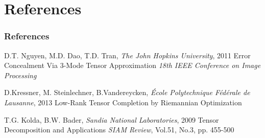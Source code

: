 \documentclass{beamer}
\begin{document}
\section*{References}
\begin{frame}
\frametitle{References}
\footnotesize{
\begin{thebibliography}{99} %
\bibitem[ALS]{} D.T. Nguyen, M.D. Dao, T.D. Tran, \textit{The John Hopkins University}, 2011
\newblock Error Concealment Via 3-Mode Tensor Approximation
\newblock \emph{18th IEEE Conference on Image Processing}

\bibitem[GeomCG]{} D.Kressner, M. Steinlechner, B.Vandereycken, \textit{\'Ecole Polytechnique F\'ed\'erale de Lausanne}, 2013
\newblock Low-Rank Tensor Completion by Riemannian Optimization

 T.G. Kolda, B.W. Bader, \textit{Sandia National Laboratories}, 2009
\newblock Tensor Decomposition and Applications
\newblock \emph{SIAM Review}, Vol.51, No.3, pp. 455-500
\end{thebibliography}
}
\end{frame}
\end{document}
